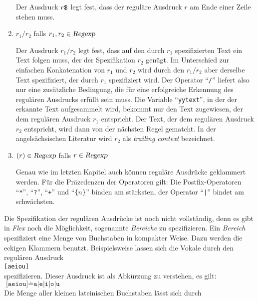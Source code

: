\begin{enumerate}
      Der Ausdruck $r\texttt{\symbol{36}}$ legt fest, dass der regul\"are Ausdruck $r$
      am Ende einer Zeile stehen muss.  
\item $r_1\texttt{/}r_2$ \quad falls $r_1, r_2 \in \textsl{Regexp}$
  
      Der Ausdruck $r_1\texttt{/}r_2$ legt fest, dass auf den durch $r_1$ spezifizierten Text
      ein Text folgen muss, der der Spezifikation $r_2$ gen\"ugt.  Im Unterschied zur einfachen
      Konkatenation von $r_1$ und $r_2$ wird durch den $r_1\texttt{/}r_2$ aber derselbe Text
      spezifiziert, der durch $r_1$ spezifiziert wird.  Der Operator ``\texttt{/}'' liefert
      also nur eine zus\"atzliche Bedingung, die f\"ur eine erfolgreiche Erkennung des regul\"aren
      Ausdrucks erf\"ullt sein muss.  Die Variable ``\texttt{yytext}'', in der der erkannte Text
      aufgesammelt wird, bekommt nur den Text zugewiesen, der dem regul\"aren Ausdruck $r_1$
      entspricht.  Der Text, der dem regul\"aren Ausdruck $r_2$ entspricht, wird dann von der
      n\"achsten Regel gematcht.  In der angels\"achsischen Literatur wird $r_2$ als
      \emph{trailing context} bezeichnet.
\item $(r) \in \textsl{Regexp}$ \quad falls $r \in \textsl{Regexp}$

      Genau wie im letzten Kapitel auch k\"onnen regul\"are Ausdr\"ucke geklammert werden.
      F\"ur die Pr\"azedenzen der Operatoren gilt:
      Die Postfix-Operatoren ``\texttt{*}'', ``\texttt{?}'', ``\texttt{+}'' und ``\texttt{\{}$n$\texttt{\}}''
      binden am st\"arksten, der Operator ``\texttt{|}'' bindet am schw\"achsten.
\end{enumerate}
Die Spezifikation der regul\"aren Ausdr\"ucke ist noch nicht vollst\"andig, denn es gibt in \textsl{Flex}
noch die M\"oglichkeit, sogenannte \emph{Bereiche} zu spezifizieren.  Ein \emph{Bereich}
spezifiziert eine Menge von Buchstaben in kompakter Weise.  Dazu werden die eckigen
Klammern benutzt.  Beispielsweise lassen sich die Vokale durch den regul\"aren Ausdruck
\\[0.2cm]
\hspace*{1.3cm}
\texttt{[aeiou]}
\\[0.2cm]
spezifizieren.  Dieser Ausdruck ist als Abk\"urzung zu verstehen, es gilt:
\\[0.2cm]
\hspace*{1.3cm}
$\texttt{[aeiou]} \doteq \texttt{a|e|i|o|u}$
\\[0.2cm]
Die Menge aller kleinen lateinischen Buchstaben l\"asst sich durch
\\[0.2cm]
